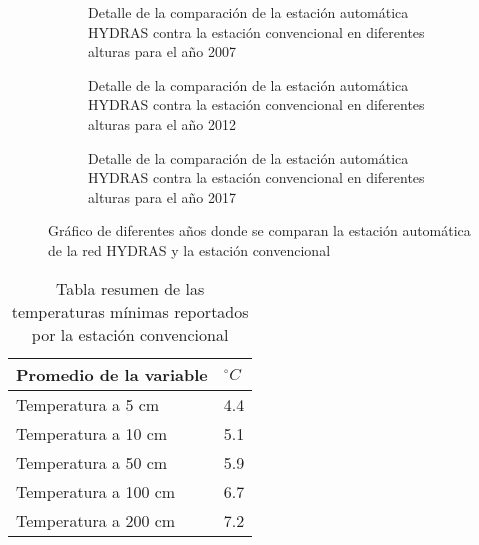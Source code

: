 \documentclass[11pt]{article}
\def\celc{$^{\circ}C$ }%
\begin{document}
\begin{figure}[H]
	
			
			\begin{subfigure}[b]{\textwidth}

			\caption{Detalle de la comparación de la estación automática HYDRAS contra la estación convencional en diferentes alturas para el año 2007}
			\label{suelo_2007}

			\end{subfigure}
	

			
			\begin{subfigure}[b]{\textwidth}

		\caption{Detalle de la comparación de la estación automática HYDRAS contra la estación convencional en diferentes alturas para el año 2012}
			\label{suelo_2012}

			\end{subfigure}		
			
			\begin{subfigure}[b]{\textwidth}

		\caption{Detalle de la comparación de la estación automática HYDRAS contra la estación convencional en diferentes alturas para el año 2017}
			\label{suelo_2017}

			\end{subfigure}			

		
		\caption{Gráfico de diferentes años donde se comparan la estación automática de la red HYDRAS y la estación convencional}
		\label{grafica_dif_alt_suelo}
	
\end{figure}





\begin{table}[]
\centering

\begin{tabular}{l|l}
\textbf{Promedio de la variable} & \textbf{\celc} \\ \hline
Temperatura a 5 cm               & 4.4         \\
Temperatura a 10 cm              & 5.1         \\
Temperatura a 50 cm              & 5.9         \\
Temperatura a 100 cm             & 6.7         \\
Temperatura a 200 cm             & 7.2        
\end{tabular}
\caption{Tabla resumen de las temperaturas mínimas reportados por la estación convencional}
\label{tabla_minimas_convencional}
\end{table}
\end{document}
